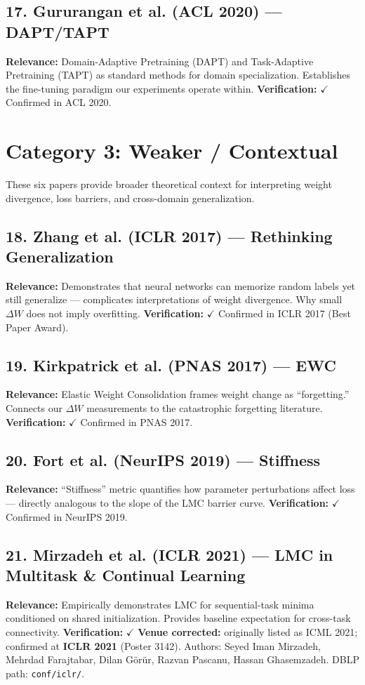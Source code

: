 \documentclass[11pt,a4paper]{article}
\begin{document}
\subsection*{17. Gururangan et al. (ACL 2020) --- DAPT/TAPT}
\textbf{Relevance:} Domain-Adaptive Pretraining (DAPT) and Task-Adaptive Pretraining (TAPT) as standard methods for domain specialization. Establishes the fine-tuning paradigm our experiments operate within. \textbf{Verification:} $\checkmark$ Confirmed in ACL 2020.

\section{Category 3: Weaker / Contextual}

These six papers provide broader theoretical context for interpreting weight divergence, loss barriers, and cross-domain generalization.

\subsection*{18. Zhang et al. (ICLR 2017) --- Rethinking Generalization}
\textbf{Relevance:} Demonstrates that neural networks can memorize random labels yet still generalize --- complicates interpretations of weight divergence. Why small $\Delta W$ does not imply overfitting. \textbf{Verification:} $\checkmark$ Confirmed in ICLR 2017 (Best Paper Award).

\subsection*{19. Kirkpatrick et al. (PNAS 2017) --- EWC}
\textbf{Relevance:} Elastic Weight Consolidation frames weight change as ``forgetting.'' Connects our $\Delta W$ measurements to the catastrophic forgetting literature. \textbf{Verification:} $\checkmark$ Confirmed in PNAS 2017.

\subsection*{20. Fort et al. (NeurIPS 2019) --- Stiffness}
\textbf{Relevance:} ``Stiffness'' metric quantifies how parameter perturbations affect loss --- directly analogous to the slope of the LMC barrier curve. \textbf{Verification:} $\checkmark$ Confirmed in NeurIPS 2019.

\subsection*{21. Mirzadeh et al. (ICLR 2021) --- LMC in Multitask \& Continual Learning}
\textbf{Relevance:} Empirically demonstrates LMC for sequential-task minima conditioned on shared initialization. Provides baseline expectation for cross-task connectivity. \textbf{Verification:} $\checkmark$ \textbf{Venue corrected:} originally listed as ICML 2021; confirmed at \textbf{ICLR 2021} (Poster 3142). Authors: Seyed Iman Mirzadeh, Mehrdad Farajtabar, Dilan G\"{o}r\"{u}r, Razvan Pascanu, Hassan Ghasemzadeh. DBLP path: \texttt{conf/iclr/}.
\end{document}
